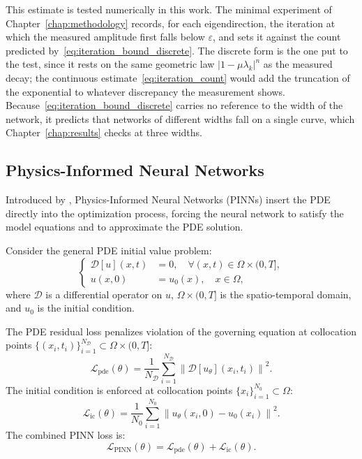 This estimate is tested numerically in this work. The minimal experiment of Chapter~\ref{chap:methodology} records, for each eigendirection, the iteration at which the measured amplitude first falls below $\varepsilon$, and sets it against the count predicted by~\eqref{eq:iteration_bound_discrete}. The discrete form is the one put to the test, since it rests on the same geometric law $|1 - \mu\lambda_k|^n$ as the measured decay; the continuous estimate~\eqref{eq:iteration_count} would add the truncation of the exponential to whatever discrepancy the measurement shows. Because~\eqref{eq:iteration_bound_discrete} carries no reference to the width of the network, it predicts that networks of different widths fall on a single curve, which Chapter~\ref{chap:results} checks at three widths.

\subsection{Physics-Informed Neural Networks}
\label{subsec:pinn}

Introduced by \textcite{raissi2019}, Physics-Informed Neural Networks (PINNs) insert the PDE directly into the optimization process, forcing the neural network to satisfy the model equations and to approximate the PDE solution.

Consider the general PDE initial value problem:
\begin{equation}\label{eq:generic_pde}
    \left\{
    \begin{aligned}
        \mathcal{D}[u](x,t) &= 0, \quad \forall (x,t) \in \Omega \times (0,T], \\
        u(x,0)              &= u_0(x), \quad x \in \Omega,
    \end{aligned}
    \right.
\end{equation}
\noindent where $\mathcal{D}$ is a differential operator on $u$, $\Omega \times (0,T]$ is the spatio-temporal domain, and $u_0$ is the initial condition.

The PDE residual loss penalizes violation of the governing equation at collocation points $\{(x_i,t_i)\}_{i=1}^{N_\mathcal{D}} \subset \Omega \times (0,T]$:
\begin{equation*}
    \mathcal{L}_{\text{pde}}(\theta) = \frac{1}{N_\mathcal{D}}\sum_{i=1}^{N_\mathcal{D}}
    \left\| \mathcal{D}[u_\theta](x_i,t_i)\right\|^2.
\end{equation*}
The initial condition is enforced at collocation points $\{x_i\}_{i=1}^{N_0} \subset \Omega$:
\begin{equation*}
    \mathcal{L}_{\text{ic}}(\theta) = \frac{1}{N_0}\sum_{i=1}^{N_0}
    \left\| u_\theta(x_i,0) - u_0(x_i) \right\|^2.
\end{equation*}
The combined PINN loss is:
\begin{equation}\label{eq:loss_pinn}
    \mathcal{L}_{\text{PINN}}(\theta) = \mathcal{L}_{\text{pde}}(\theta) + \mathcal{L}_{\text{ic}}(\theta).
\end{equation}

